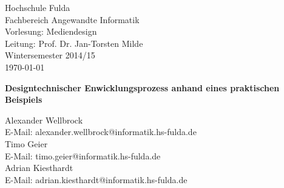 
\begin{titlepage}
	
	\setlength{\parindent}{0em}
	\begin{small}
		\vfill {Hochschule Fulda\\
		Fachbereich Angewandte Informatik\\ 
		Vorlesung: Mediendesign\\
		Leitung: Prof. Dr. Jan-Torsten Milde\\
		Wintersemester 2014/15 \\
		\today}
	\end{small}

	\begin{center}
		\begin{Large}
			\vfill {\textsf{\textbf{
			Designtechnischer Enwicklungsprozess anhand eines praktischen Beispiels
			}}}
		\end{Large}
	\end{center}

	\setlength{\parindent}{0em}
	\begin{small}
		\vfill Alexander Wellbrock\\ E-Mail: alexander.wellbrock@informatik.hs-fulda.de\\
		Timo Geier\\ E-Mail: timo.geier@informatik.hs-fulda.de\\
		Adrian Kiesthardt\\ E-Mail: adrian.kiesthardt@informatik.hs-fulda.de
	\end{small}

\end{titlepage}